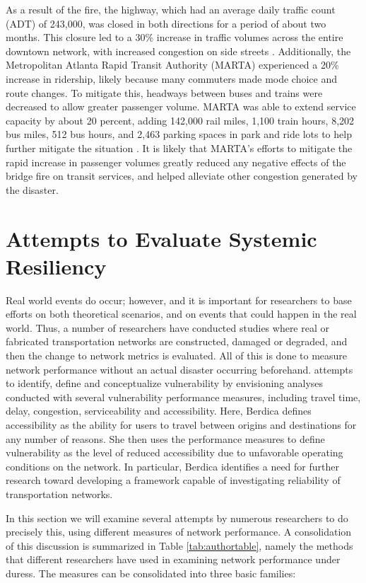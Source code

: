 As a result of the fire, the highway, which had an average daily traffic
count (ADT) of 243,000,
was closed in both directions for a period of about two months. This
closure led to a 30\%
increase in traffic volumes across the entire downtown network, with
increased congestion on side
streets \citep{hamedi2018}. Additionally, the Metropolitan Atlanta Rapid
Transit Authority
(MARTA) experienced a 20\% increase in ridership, likely because many
commuters made mode choice
and route changes. To mitigate this, headways between buses and trains
were decreased to allow
greater passenger volume. MARTA was able to extend service capacity by about 20 percent, adding 142,000 rail miles, 1,100
train hours, 8,202 bus
miles, 512 bus hours, and 2,463 parking spaces in park and ride lots to
help further mitigate the
situation \citep{marta2017, marta2018}. It is likely that MARTA’s efforts
to mitigate the rapid increase in passenger
volumes greatly reduced any negative effects of the bridge
fire on transit services, and helped alleviate other congestion generated by the disaster.

\section{Attempts to Evaluate Systemic Resiliency}

Real world events do occur; however, and it is important for researchers to
base efforts on both theoretical scenarios, and on events that could happen in
the real world. Thus, a number of researchers have conducted studies where real
or fabricated transportation networks are constructed, damaged or degraded, and
then the change to network metrics is evaluated. All of this is done to measure
network performance without
an actual disaster occurring beforehand.
\citet{berdica2002}
attempts
to identify, define and conceptualize vulnerability by envisioning
analyses conducted with
several vulnerability performance measures, including travel time, delay,
congestion,
serviceability and accessibility. Here, Berdica defines accessibility as
the ability for users to
travel between origins and destinations for any number of reasons. She
then uses the performance
measures to define vulnerability as the level of reduced accessibility due
to unfavorable
operating conditions on the network. In particular, Berdica identifies a
need for further
research toward developing a framework capable of investigating
reliability of transportation
networks.

In this section we will examine several attempts by numerous researchers
to do precisely this,
using different measures of network performance. A consolidation of this
discussion is summarized
in Table \ref{tab:authortable}, namely the methods that different researchers have
used in examining network
performance under duress. The measures can be consolidated into three
basic families:

